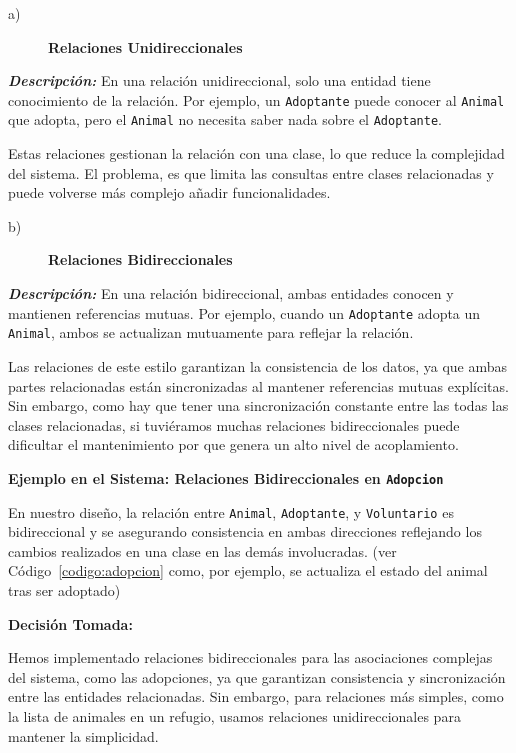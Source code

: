 \begin{description}
    \item[a)] \textbf{Relaciones Unidireccionales}
\end{description}

\textit{\textbf{Descripción:}}  
En una relación unidireccional, solo una entidad tiene conocimiento de la relación. 
Por ejemplo, un \texttt{Adoptante} puede conocer al \texttt{Animal} que adopta, 
pero el \texttt{Animal} no necesita saber nada sobre el \texttt{Adoptante}.\par
\vspace{0.15cm} 
Estas relaciones gestionan la relación con una clase, lo que reduce la complejidad del sistema.
El problema, es que limita las consultas entre clases relacionadas y puede volverse más complejo 
añadir funcionalidades.\par
\vspace{0.15cm}

\begin{description}
    \item[b)] \textbf{Relaciones Bidireccionales}
\end{description}

\textit{\textbf{Descripción:}}  
En una relación bidireccional, ambas entidades conocen y mantienen referencias mutuas. 
Por ejemplo, cuando un \texttt{Adoptante} adopta un \texttt{Animal}, ambos se actualizan 
mutuamente para reflejar la relación.\par
\vspace{0.15cm}
Las relaciones de este estilo garantizan la consistencia de los datos, ya que ambas partes relacionadas están 
sincronizadas al mantener referencias mutuas explícitas. Sin embargo, como hay que tener una sincronización constante 
entre las todas las clases relacionadas, si tuviéramos muchas relaciones bidireccionales puede dificultar el mantenimiento
por que genera un alto nivel de acoplamiento.\par
\vspace{0.15cm}
\textbf{Ejemplo en el Sistema: Relaciones Bidireccionales en \texttt{Adopcion}}\par 
En nuestro diseño, la relación entre \texttt{Animal}, \texttt{Adoptante}, y 
\texttt{Voluntario} es bidireccional y se asegurando consistencia en ambas direcciones
reflejando los cambios realizados en una clase en las demás involucradas.
(ver Código~\ref{codigo:adopcion} como, por ejemplo, se actualiza el estado del animal tras ser adoptado)\par
\vspace{0.15cm}
\textbf{Decisión Tomada:}\par
Hemos implementado relaciones bidireccionales para las asociaciones complejas del sistema, 
como las adopciones, ya que garantizan consistencia y sincronización entre las entidades 
relacionadas. Sin embargo, para relaciones más simples, como la lista de animales en un 
refugio, usamos relaciones unidireccionales para mantener la simplicidad.


